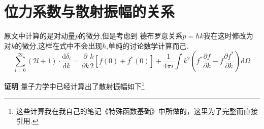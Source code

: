 \section{位力系数与散射振幅的关系}

原文中计算的是对动量$p$的微分,但是考虑到 德布罗意关系$p=\hbar k$我在这时修改为对$k$的微分,这样在式中不会出现$\hbar$,单纯的讨论数学计算而己.
\begin{equation}
  \sum_{l=0}^\infty (2l+1)\cdot \frac{\mathrm{d}\delta_l}{\mathrm{d}k}
  =\frac{\partial}{\partial k} \frac{k}{2}\left[f(0)+f^*(0)\right]
  +\frac{1}{4\pi i}\int k^2(f^*\frac{\partial f}{\partial k}-f\frac{\partial f^*}{\partial k})\mathrm{d}\Omega
  \label{eq:zhenfu}
\end{equation}

{\bf 证明} 量子力学中已经计算出了散射振幅如下\footnote{这些计算我在我自己的笔记《特殊函数基础》中所做的，这里为了完整而直接引用.} 

